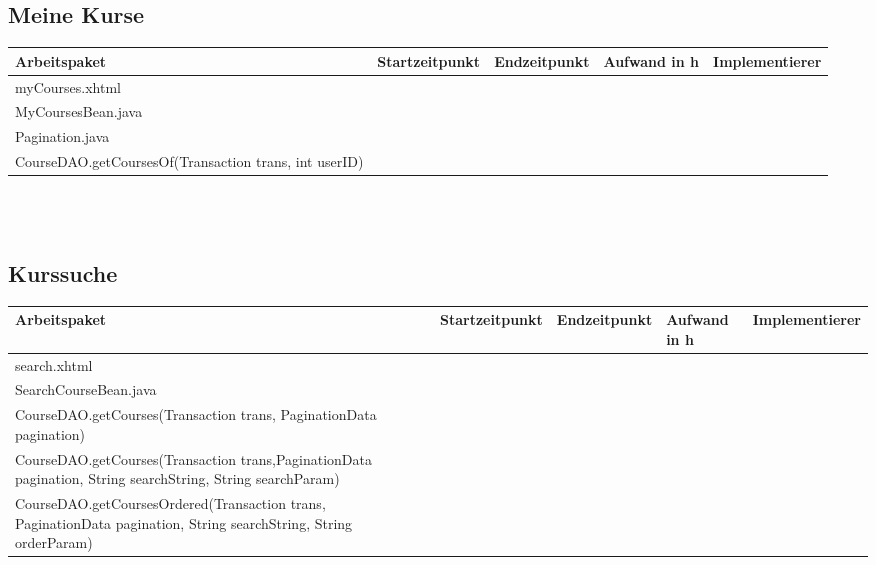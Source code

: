 \documentclass[12pt,a4paper]{scrreprt}
\begin{document}
\begin{landscape}
   	\subsection{Meine Kurse}
   	\begin{tabular}{|p{10cm}|p{4cm}|p{3cm}|p{3cm}|p{3cm}|}
   		\hline  \textbf{Arbeitspaket} & \textbf{Startzeitpunkt} & \textbf{Endzeitpunkt} & \textbf{Aufwand in h} & \textbf{Implementierer} \\ 
   		\hline   myCourses.xhtml                                      &                            &                             &                     &\\
   		\hline   MyCoursesBean.java                                   &                            &                             &                     &\\ 
   		\hline   Pagination.java                                      &                            &                             &                     &\\ 
   		\hline   CourseDAO.getCoursesOf(Transaction trans, int userID)&                            &                             &                     &\\ 
   		\hline 
   	\end{tabular} \ \\
   	\ \\
   	
   	\subsection{Kurssuche}
   	\begin{tabular}{|p{10cm}|p{4cm}|p{3cm}|p{3cm}|p{3cm}|}
   		\hline  \textbf{Arbeitspaket} & \textbf{Startzeitpunkt} & \textbf{Endzeitpunkt} & \textbf{Aufwand in h} & \textbf{Implementierer} \\ 
   		\hline   search.xhtml                                         &                            &                             &                     &\\
   		\hline   SearchCourseBean.java                                &                            &                             &                     &\\ 
   		\hline   CourseDAO.getCourses(Transaction trans, PaginationData pagination)                                      &                            &                             &                     &\\ 
   		\hline  CourseDAO.getCourses(Transaction trans,PaginationData pagination, String searchString, String searchParam)&                            &                             &                     &\\
   		\hline  CourseDAO.getCoursesOrdered(Transaction trans, PaginationData pagination, String searchString, String orderParam)&                            &                             &                     &\\ 
   		\hline 
   	\end{tabular} \ \\
   	\ \\
   	

\end{landscape}
\end{document}
